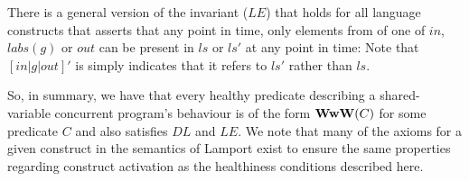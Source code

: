 There is a general version of the invariant ($LE$) that holds
for all language constructs that asserts that any point in time,
only elements from of one of $in$, $labs(g)$ or $out$
can be present in $ls$ or $ls'$ at any point in time:
Note that $[in|g|out]'$ is simply indicates that it refers to $ls'$
rather than $ls$.

So, in summary, we have that every healthy predicate describing
a shared-variable concurrent program's behaviour is of the form $\mathbf{WwW}(C)$
for some predicate $C$ and also satisfies $DL$ and  $LE$.
We note that many of the axioms for a given construct
in the semantics of Lamport\cite{Lamport1985}
exist to ensure the same properties regarding construct
activation as the healthiness conditions described here.
